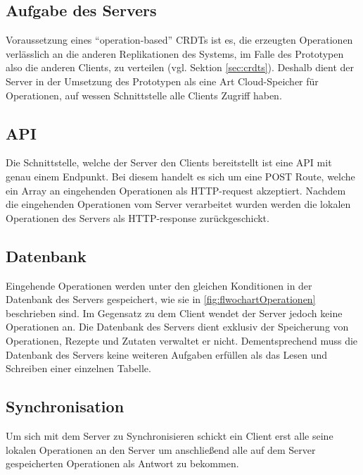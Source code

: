 \documentclass[a4paper, 12pt]{scrreprt}
\begin{document}
\subsection{Aufgabe des Servers}
\label{sec:AufgabeServer}

Voraussetzung eines \enquote{operation-based} CRDTs ist es, die erzeugten Operationen verlässlich an die anderen Replikationen des Systems, im Falle des Prototypen also die anderen Clients, zu verteilen (vgl. Sektion \ref{sec:crdts}). Deshalb dient der Server in der Umsetzung des Prototypen als eine Art Cloud-Speicher für Operationen, auf wessen Schnittstelle alle Clients Zugriff haben. 

\subsection{API}

Die Schnittstelle, welche der Server den Clients bereitstellt ist eine API mit genau einem Endpunkt. Bei diesem handelt es sich um eine POST Route, welche ein Array an eingehenden Operationen als HTTP-request akzeptiert. Nachdem die eingehenden Operationen vom Server verarbeitet wurden werden die lokalen Operationen des Servers als HTTP-response zurückgeschickt. 

\subsection{Datenbank}

Eingehende Operationen werden unter den gleichen Konditionen in der Datenbank des Servers gespeichert, wie sie in \ref{fig:flwochartOperationen} beschrieben sind. Im Gegensatz zu dem Client wendet der Server jedoch keine Operationen an. Die Datenbank des Servers dient exklusiv der Speicherung von Operationen, Rezepte und Zutaten verwaltet er nicht. Dementsprechend muss die Datenbank des Servers keine weiteren Aufgaben erfüllen als das Lesen und Schreiben einer einzelnen Tabelle. 

\subsection{Synchronisation}

Um sich mit dem Server zu Synchronisieren schickt ein Client erst alle seine lokalen Operationen an den Server um anschließend alle auf dem Server gespeicherten Operationen als Antwort zu bekommen.
\end{document}
